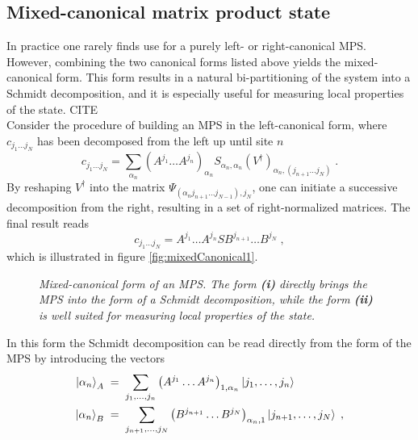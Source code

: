 \subsection{Mixed-canonical matrix product state}
In practice one rarely finds use for a purely left- or right-canonical MPS. However, combining the two canonical forms listed above yields the mixed-canonical form. This form results in a natural bi-partitioning of the system into a Schmidt decomposition, and it is especially useful for measuring local properties of the state. CITE\\
Consider the procedure of building an MPS in the left-canonical form, where $c_{j_1 \ldots j_N}$ has been decomposed from the left up until site $n$
\begin{equation}
	c_{j_1 \ldots j_N} = \sum_{\alpha_n} \left( A^{j_1} \ldots  A^{j_n} \right) _{\alpha_n} S_{\alpha_n , \alpha_n} (V^{\dag})_{\alpha_n , (j_{n+1} \ldots j_N)} \; .
\end{equation}
By reshaping $V^{\dag}$  into the matrix $\Psi_{(\alpha_n j_{n+1} \ldots j_{N-1}),j_N}$, one can initiate a successive decomposition from the right, resulting in a set of right-normalized matrices. The final result reads
\begin{equation}
	c_{j_1 \ldots j_N} = A^{j_1} \ldots A^{j_n} S B^{j_{n+1}} \ldots B^{j_N} \; ,
	\label{eq:mixedCanon}
\end{equation}
which is illustrated in figure \ref{fig:mixedCanonical1}.
\begin{figure}[h!]
\centering %
\begin{subfigure}[b]{0.45\textwidth}
  	
	\caption{}
	\label{fig:MixedCanonical1}
\end{subfigure}
\hspace{5mm}
\begin{subfigure}[b]{0.45\textwidth}    
  	
	\caption{}
	\label{fig:MixedCanonical2}
\end{subfigure}
\caption{\textit{Mixed-canonical form of an MPS. The form \textbf{(i)} directly brings the MPS into the form of a Schmidt decomposition, while the form \textbf{(ii)} is well suited for measuring local properties of the state.}}
\end{figure}
In this form the Schmidt decomposition can be read directly from the form of the MPS by introducing the vectors
\begin{align}
 	\ket{\alpha_n}_A \; &= \; \sum_{j_1 , \ldots , j_n} \left( A^{j_1} \ldots A^{j_n} \right)_{1,\alpha_n} \ket{j_1 , \ldots , j_n}  \label{eq:mixedA} \\
 	\ket{\alpha_n}_B \; &= \; \sum_{j_{n+1} , \ldots , j_N} \left( B^{j_{n+1}} \ldots B^{j_N} \right)_{\alpha_n , 1} \ket{j_{n+1} , \ldots , j_N} \; , \label{eq:mixedB}
\end{align}
